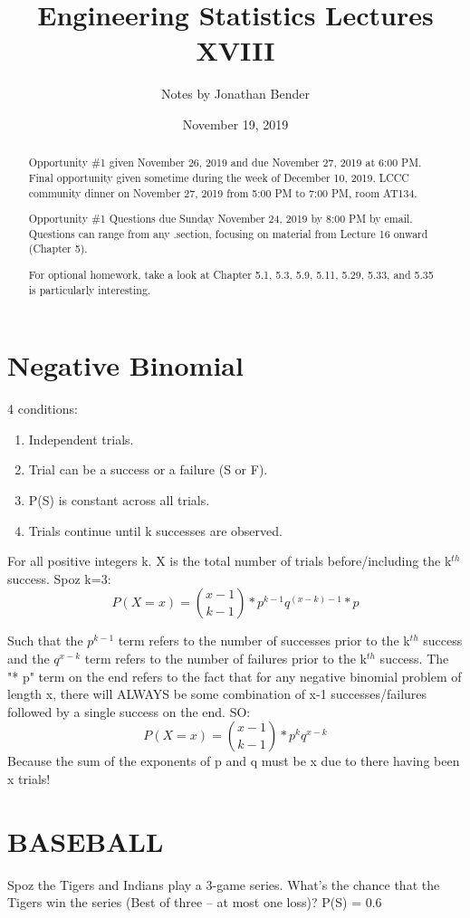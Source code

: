 \documentclass[]{article}
\title{Engineering Statistics Lectures XVIII}
\author{Notes by Jonathan Bender}
\date{November 19, 2019}
\begin{document}
	
	\maketitle
	
	\begin{abstract}
		Opportunity \#1 given November 26, 2019 and due November 27, 2019 at 6:00 PM.
		Final opportunity given sometime during the week of December 10, 2019.
		LCCC community dinner on November 27, 2019 from 5:00 PM to 7:00 PM, room AT134.
		
		Opportunity \#1 Questions due Sunday November 24, 2019 by 8:00 PM by email. Questions can range from any .section, focusing on material from Lecture 16 onward (Chapter 5).
		
		For optional homework, take a look at Chapter 5.1, 5.3, 5.9, 5.11, 5.29, 5.33, and 5.35 is particularly interesting.
	\end{abstract}

	\section{Negative Binomial}
		4 conditions:
		\begin{enumerate}
			\item Independent trials.
			\item Trial can be a success or a failure (S or F).
			\item P(S) is constant across all trials.
			\item Trials continue until k successes are observed.
		\end{enumerate}
		For all positive integers k. X is the total number of trials before/including the k$^{th}$ success. Spoz k=3: $$P(X=x) = \binom{x-1}{k-1} * p^{k-1}q^{(x-k)-1} * p$$
		
		Such that the $p^{k-1}$ term refers to the number of successes prior to the k$^{th}$ success and the $q^{x-k}$ term refers to the number of failures prior to the k$^{th}$ success. The "* p" term on the end refers to the fact that for any negative binomial problem of length x, there will ALWAYS be some combination of x-1 successes/failures followed by a single success on the end. SO:
		$$P(X=x) = \binom{x-1}{k-1} * p^{k}q^{x-k}$$
		Because the sum of the exponents of p and q must be x due to there having been x trials!
		
	\section{BASEBALL}
		Spoz the Tigers and Indians play a 3-game series. What's the chance that the Tigers win the series (Best of three -- at most one loss)? P(S) = 0.6
		
\end{document}
